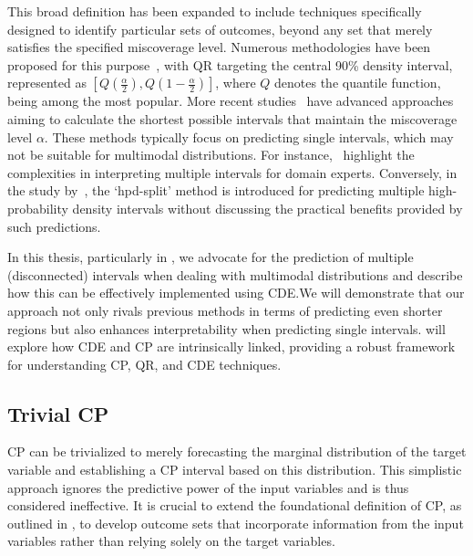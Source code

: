 This broad definition has been expanded to include techniques specifically designed to identify particular sets of outcomes, beyond any set that merely satisfies the specified miscoverage level. Numerous methodologies have been proposed for this purpose~\cite{sesia2021conformal, chernozhukov2021distributional, balasubramanian2014conformal, shafer2008tutorial}, with QR targeting the central 90\% density interval, represented as $[Q(\frac{\alpha}{2}), Q(1-\frac{\alpha}{2})]$, where $Q$ denotes the quantile function, being among the most popular. More recent studies~\cite{sesia2021conformal, chernozhukov2021distributional} have advanced approaches aiming to calculate the shortest possible intervals that maintain the miscoverage level $\alpha$. These methods typically focus on predicting single intervals, which may not be suitable for multimodal distributions. For instance,~\cite{sesia2021conformal} highlight the complexities in interpreting multiple intervals for domain experts. Conversely, in the study by~\cite{izbicki2022cd}, the `hpd-split' method is introduced for predicting multiple high-probability density intervals without discussing the practical benefits provided by such predictions.

In this thesis, particularly in , we advocate for the prediction of multiple (disconnected) intervals when dealing with multimodal distributions and describe how this can be effectively implemented using CDE.\@ We will demonstrate that our approach not only rivals previous methods in terms of predicting even shorter regions but also enhances interpretability when predicting single intervals.  will explore how CDE and CP are intrinsically linked, providing a robust framework for understanding CP, QR, and CDE techniques.

\subsection{Trivial CP}\label{sec:trivial_cp}

CP can be trivialized to merely forecasting the marginal distribution of the target variable and establishing a CP interval based on this distribution. This simplistic approach ignores the predictive power of the input variables and is thus considered ineffective. It is crucial to extend the foundational definition of CP, as outlined in , to develop outcome sets that incorporate information from the input variables rather than relying solely on the target variables.

